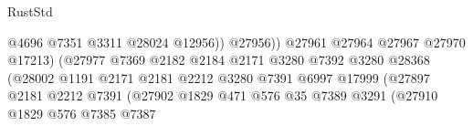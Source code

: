 \begin{lexlean}{RustStd}
\begin{coremodule}
                                                        @4696
                                                        @7351
                                                        @3311
                                                        @28024
                                                        @12956))
                                                    @27956))
                                                @27961
                                                @27964
                                                @27967
                                                @27970
                                                @17213)
                                              (@27977
                                                @7369
                                                @2182
                                                @2184
                                                @2171
                                                @3280
                                                @7392
                                                @3280
                                                @28368
                                                (@28002
                                                  @1191
                                                  @2171
                                                  @2181
                                                  @2212
                                                  @3280
                                                  @7391
                                                  @6997
                                                  @17999
                                                  (@27897
                                                    @2181
                                                    @2212
                                                    @7391
                                                    (@27902
                                                      @1829
                                                      @471
                                                      @576
                                                      @35
                                                      @7389
                                                      @3291
                                                      (@27910
                                                        @1829
                                                        @576
                                                        @7385
                                                        @7387

\end{coremodule}
\end{lexlean}
